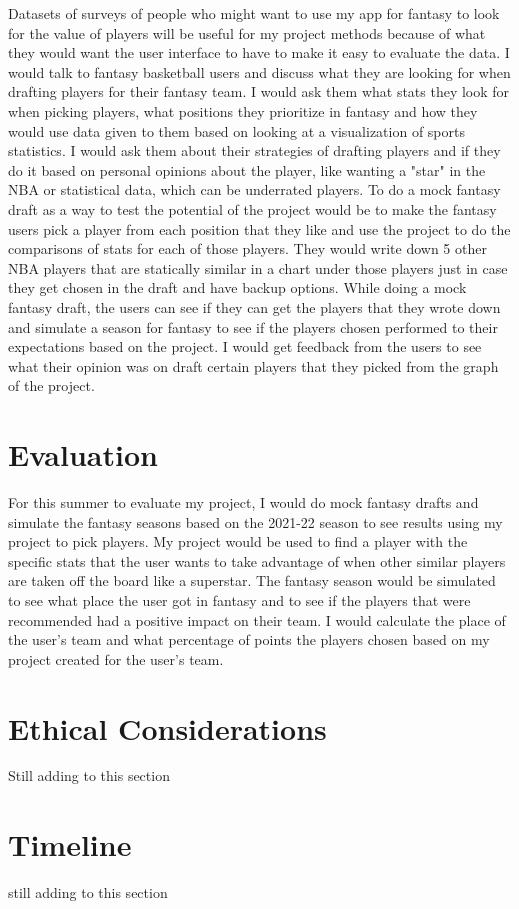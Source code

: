 \documentclass[10pt,twocolumn]{article}
\begin{document}
Datasets of surveys of people who might want to use my app for fantasy to look for the value of players will be useful for my project methods because of what they would want the user interface to have to make it easy to evaluate the data. I would talk to fantasy basketball users and discuss what they are looking for when drafting players for their fantasy team. I would ask them what stats they look for when picking players, what positions they prioritize in fantasy and how they would use data given to them based on looking at a visualization of sports statistics. I would ask them about their strategies of drafting players and if they do it based on personal opinions about the player, like wanting a "star" in the NBA or statistical data, which can be underrated players. To do a mock fantasy draft as a way to test the potential of the project would be to make the fantasy users pick a player from each position that they like and use the project to do the comparisons of stats for each of those players. They would write down 5 other NBA players that are statically similar in a chart under those players just in case they get chosen in the draft and have backup options. While doing a mock fantasy draft, the users can see if they can get the players that they wrote down and simulate a season for fantasy to see if the players chosen performed to their expectations based on the project. I would get feedback from the users to see what their opinion was on draft certain players that they picked from the graph of the project.  


\section{Evaluation}

For this summer to evaluate my project, I would do mock fantasy drafts and simulate the fantasy seasons based on the 2021-22 season to see results using my project to pick players. My project would be used to find a player with the specific stats that the user wants to take advantage of when other similar players are taken off the board like a superstar. The fantasy season would be simulated to see what place the user got in fantasy and to see if the players that were recommended had a positive impact on their team. I would calculate the place of the user's team and what percentage of points the players chosen based on my project created for the user's team. 

\section{Ethical Considerations}

Still adding to this section

\section{Timeline}

still adding to this section

\printbibliography 
\end{document}

